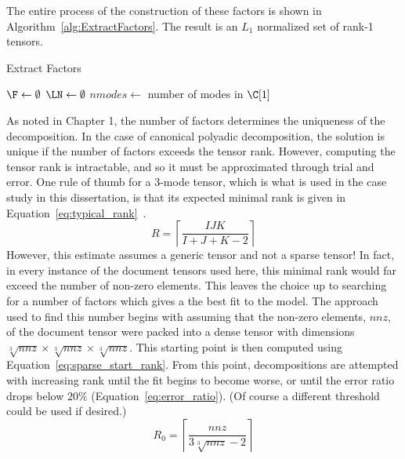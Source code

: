 \documentclass[../ut-dissertation.tex]{subfiles}
\begin{document}
The entire process of the construction of these factors is shown in
Algorithm~\ref{alg:ExtractFactors}.  The result is an $L_1$ normalized
set of rank-1 tensors.  
\begin{algorithm}
  \label{alg:ExtractFactors}
  \caption{Extract Factors}
    
   
  \Output{\LN, \F}
  \BlankLine
  $\F \leftarrow \emptyset$\;
  $\LN \leftarrow \emptyset$\;
  $nmodes \leftarrow$ number of modes in $\C[1]$\;
  \Return{\LN, \F}
\end{algorithm}

As noted in Chapter 1, the number of factors determines the uniqueness
of the decomposition.  In the case of canonical polyadic
decomposition, the solution is unique if the number of factors exceeds
the tensor rank.  However, computing the tensor rank is intractable,
and so it must be approximated through trial and error.  One rule of
thumb for a 3-mode tensor, which is what is used in the case study in
this dissertation, is that its expected minimal rank is given in
Equation~\ref{eq:typical_rank}~\cite{comon2009}.
\begin{equation} \label{eq:typical_rank}
  R = \left\lceil \displaystyle\frac{IJK}{I+J+K-2} \right\rceil
\end{equation}
However, this estimate assumes a generic tensor and not a sparse
tensor!  In fact, in every instance of the document tensors used here,
this minimal rank would far exceed the number of non-zero elements.
This leaves the choice up to searching for a number of factors which
gives a the best fit to the model.  The approach used to find this
number begins with assuming that the non-zero elements, $nnz$, of the
document tensor were packed into a dense tensor with dimensions
$\sqrt[3]{nnz} \times \sqrt[3]{nnz} \times \sqrt[3]{nnz}$.  This
starting point is then computed using
Equation~\ref{eq:sparse_start_rank}.  From this point, decompositions
are attempted with increasing rank until the fit begins to become
worse, or until the error ratio drops below $20\%$
(Equation~\ref{eq:error_ratio}).  (Of course a different threshold
could be used if desired.)
\begin{equation}\label{eq:sparse_start_rank}
  R_0 = \left\lceil \displaystyle\frac{nnz}{3\sqrt[3]{nnz}-2} \right\rceil
  \end{equation}
  
\end{document}
